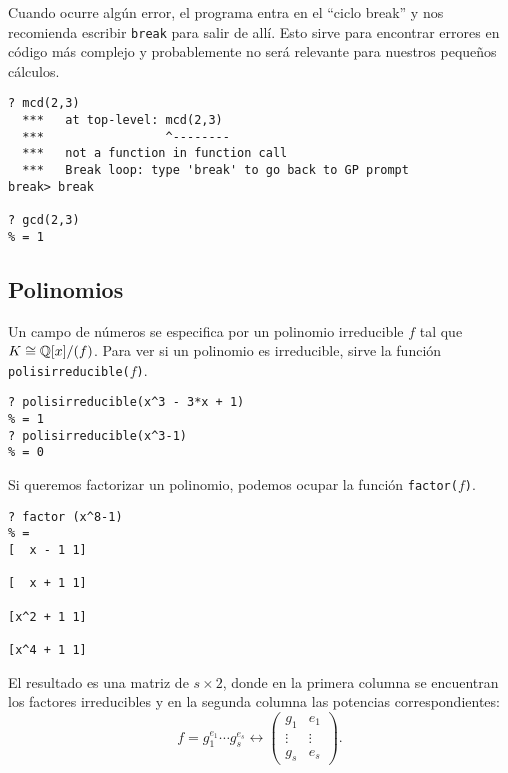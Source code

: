 Cuando ocurre algún error, el programa entra en el ``ciclo break'' y nos
recomienda escribir \texttt{break} para salir de allí. Esto sirve para encontrar
errores en código más complejo y probablemente no será relevante para nuestros
pequeños cálculos.

\begin{shaded}
\begin{verbatim}
? mcd(2,3)
  ***   at top-level: mcd(2,3)
  ***                 ^--------
  ***   not a function in function call
  ***   Break loop: type 'break' to go back to GP prompt
break> break

? gcd(2,3)
% = 1
\end{verbatim}
\end{shaded}

\pagebreak

\subsection{Polinomios}

Un campo de números se especifica por un polinomio irreducible $f$ tal que $K
\cong \mathbb{Q} [x]/(f)$. Para ver si un polinomio es irreducible, sirve la función
\texttt{polisirreducible($f$)}.

\begin{shaded}
\begin{verbatim}
? polisirreducible(x^3 - 3*x + 1)
% = 1
? polisirreducible(x^3-1)
% = 0
\end{verbatim}
\end{shaded}

Si queremos factorizar un polinomio, podemos ocupar la función
\texttt{factor($f$)}.

\begin{shaded}
\begin{verbatim}
? factor (x^8-1)
% = 
[  x - 1 1]

[  x + 1 1]

[x^2 + 1 1]

[x^4 + 1 1]
\end{verbatim}
\end{shaded}

El resultado es una matriz de $s\times 2$, donde en la primera columna se
encuentran los factores irreducibles y en la segunda columna las potencias
correspondientes:
\[ f = g_1^{e_1} \cdots g_s^{e_s} \longleftrightarrow
\begin{pmatrix}
  g_1 & e_1 \\
  \vdots & \vdots \\
  g_s & e_s
  \end{pmatrix}. \]

